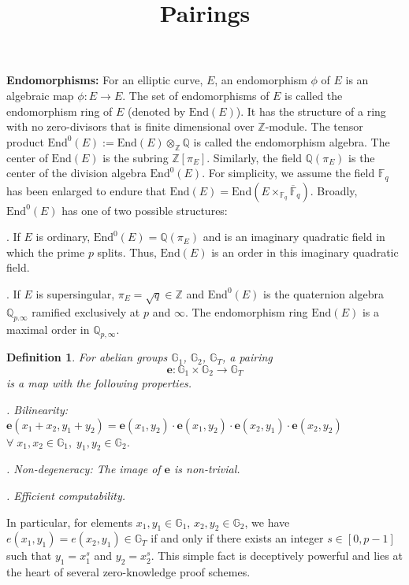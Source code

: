 \documentclass[11pt, lettersize, notitlepage, leqno, footskip=0.6cm]{article}
\newcommand{\bz}{\mathbb Z}
\newcommand{\bq}{\mathbb Q}
\newcommand{\bFq}{\mathbb{F}_q}
\newcommand{\bFQ}{\ov{\mathbb{F}}_q}
\newcommand{\lra}{\longrightarrow}
\newcommand{\mb}{\mathbb}
\newcommand{\mr}{\mathrm}
\newcommand{\ov}{\overline}
\newcommand{\noin}{\noindent}
\newcommand{\End}{\mr{End}}
\newtheorem{Def}{Definition}[section]
\numberwithin{equation}{section}
\begin{document}
 
\title{Pairings}
\author{}
\date{}
 
\maketitle


\noin \textbf{Endomorphisms:} For an elliptic curve, $E$, an endomorphism $\phi$ of $E$ is an algebraic map $\phi:E\lra E$. The set of endomorphisms of $E$ is called the endomorphism ring of $E$ (denoted by $\End(E)$). It has the structure of a ring with no zero-divisors that is finite dimensional over $\bz$-module. The tensor product $\End^0(E):= \End(E)\otimes_{\bz}\bq$ is called the endomorphism algebra. The center of $\End(E)$ is the subring $\bz[\pi_E]$. Similarly, the field $\bq(\pi_E)$ is the center of the division algebra $\End^0(E)$. For simplicity, we assume the field $\bFq$ has been enlarged to endure that $\End(E) = \End(E\times_{\bFq} \bFQ)$. Broadly, $\End^0(E)$ has one of two possible structures:

\noin 1. If $E$ is ordinary, $\End^0(E) = \bq(\pi_E)$ and is an imaginary quadratic field in which the prime $p$ splits. Thus, $\End(E)$ is an order in this imaginary quadratic field.

\noin 2. If $E$ is supersingular, $\pi_E = \sqrt{q} \in \bz$ and $\End^0(E)$ is the quaternion algebra $\bq_{p.\infty}$ ramified exclusively at $p$ and $\infty$. The endomorphism ring $\End(E)$ is a maximal order in $\bq_{p,\infty}$.


\begin{Def} \normalfont For abelian groups $\mb{G}_1$, $\mb{G}_2$, $\mb{G}_T$, a \textit{pairing} $$\mathbf{e}:\mb{G}_1\times \mb{G}_2 \lra \mb{G}_T$$ is a map with the following properties.

. Bilinearity: $\mathbf{e}(x_1+x_2,y_1+y_2) = \mathbf{e}(x_1, y_2)\cdot\mathbf{e}(x_1, y_2)\cdot\mathbf{e}(x_2, y_1)\cdot\mathbf{e}(x_2, y_2)$\\ $\forall\; x_1,x_2\in \mb{G}_1,\; y_1,y_2\in \mb{G}_2$.

. Non-degeneracy: The image of $\mathbf{e}$ is non-trivial.

. Efficient computability.\end{Def}

In particular, for elements $x_1,y_1\in \mb{G}_1$, $x_2,y_2\in \mb{G}_2$, we have $ e(x_1,y_1) = e(x_2,y_1)\in \mb{G}_T$ if and only if there exists an integer $s\in [0,p-1]$ such that $y_1 = x_1^s$ and $y_2 = x_2^s$. This simple fact is deceptively powerful and lies at the heart of several zero-knowledge proof schemes. 
\end{document}
